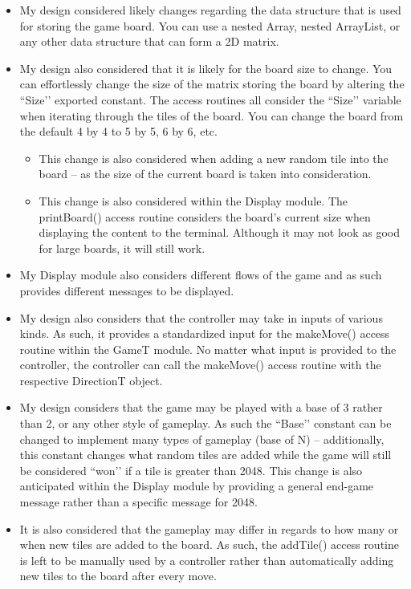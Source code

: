 \documentclass[12pt]{article}
\begin{document}
\begin{itemize}
  \item My design considered likely changes regarding the data structure that is used for storing the game board. You can use a nested Array, nested ArrayList, or any other data structure that can form a 2D matrix.
  \item My design also considered that it is likely for the board size to change. You can effortlessly change the size of the matrix storing the board by altering the ``Size’’ exported constant. The access routines all consider the ``Size’’ variable when iterating through the tiles of the board. You can change the board from the default 4 by 4 to 5 by 5, 6 by 6, etc.
  \begin{itemize}
    \item This change is also considered when adding a new random tile into the board – as the size of the current board is taken into consideration. 
    \item This change is also considered within the Display module. The printBoard() access routine considers the board’s current size when displaying the content to the terminal. Although it may not look as good for large boards, it will still work.
  \end{itemize}
  \item My Display module also considers different flows of the game and as such provides different messages to be displayed.
  \item My design also considers that the controller may take in inputs of various kinds. As such, it provides a standardized input for the makeMove() access routine within the GameT module. No matter what input is provided to the controller, the controller can call the makeMove() access routine with the respective DirectionT object.
  \item My design considers that the game may be played with a base of 3 rather than 2, or any other style of gameplay. As such the ``Base’’ constant can be changed to implement many types of gameplay (base of N) – additionally, this constant changes what random tiles are added while the game will still be considered ``won’’ if a tile is greater than 2048. This change is also anticipated within the Display module by providing a general end-game message rather than a specific message for 2048.
  \item It is also considered that the gameplay may differ in regards to how many or when new tiles are added to the board. As such, the addTile() access routine is left to be manually used by a controller rather than automatically adding new tiles to the board after every move.
\end{itemize}
\end{document}
